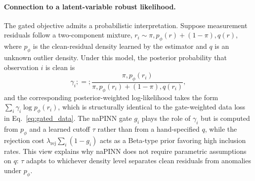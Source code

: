 \documentclass{article}
\theoremstyle{plain}
\theoremstyle{definition}
\theoremstyle{remark}
\begin{document}
\paragraph{Connection to a latent-variable robust likelihood.}
The gated objective admits a probabilistic interpretation. Suppose measurement residuals follow a two-component mixture, $r_i \sim \pi, p_\phi(r) + (1-\pi), q(r)$, where $p_\phi$ is the clean-residual density learned by the estimator and $q$ is an unknown outlier density. Under this model, the posterior probability that observation $i$ is clean is
$$\gamma_i ;=; \frac{\pi, p_\phi(r_i)}{\pi, p_\phi(r_i) + (1-\pi), q(r_i)},$$
and the corresponding posterior-weighted log-likelihood takes the form $\sum_i \gamma_i \log p_\phi(r_i)$, which is structurally identical to the gate-weighted data loss in Eq.~\eqref{eq:gated_data}. The naPINN gate $g_i$ plays the role of $\gamma_i$ but is computed from $p_\phi$ and a learned cutoff $\tau$ rather than from a hand-specified $q$, while the rejection cost $\lambda_{\text{rej}}\sum_i (1-g_i)$ acts as a Beta-type prior favoring high inclusion rates. This view explains why naPINN does not require parametric assumptions on $q$: $\tau$ adapts to whichever density level separates clean residuals from anomalies under $p_\phi$.
\end{document}
